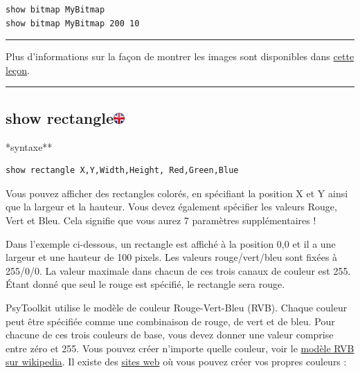 \documentclass[
]{book}
\begin{document}
\begin{verbatim}
show bitmap MyBitmap
show bitmap MyBitmap 200 10
\end{verbatim}

\begin{center}\rule{0.5\linewidth}{0.5pt}\end{center}

Plus d'informations sur la façon de montrer les images sont disponibles dans \href{https://www.psytoolkit.org/lessons/show_bitmaps.html}{cette leçon}.

\begin{center}\rule{0.5\linewidth}{0.5pt}\end{center}

\hypertarget{show-rectangle}{%
\subsection[show rectangle]{\texorpdfstring{show rectangle\href{https://www.psytoolkit.org/doc3.4.0/syntax.html\#task-show-rectangle}{\protect\includegraphics{img/ukflag.png}}}{show rectangle}}\label{show-rectangle}}

*syntaxe**

\begin{verbatim}
show rectangle X,Y,Width,Height, Red,Green,Blue
\end{verbatim}

Vous pouvez afficher des rectangles colorés, en spécifiant la position X et Y ainsi que la largeur et la hauteur. Vous devez également spécifier les valeurs Rouge, Vert et Bleu. Cela signifie que vous aurez 7 paramètres supplémentaires !

Dans l'exemple ci-dessous, un rectangle est affiché à la position 0,0 et il a une largeur et une hauteur de 100 pixels. Les valeurs rouge/vert/bleu sont fixées à 255/0/0. La valeur maximale dans chacun de ces trois canaux de couleur est 255. Étant donné que seul le rouge est spécifié, le rectangle sera rouge.

PsyToolkit utilise le modèle de couleur Rouge-Vert-Bleu (RVB). Chaque couleur peut être spécifiée comme une combinaison de rouge, de vert et de bleu. Pour chacune de ces trois couleurs de base, vous devez donner une valeur comprise entre zéro et 255. Vous pouvez créer n'importe quelle couleur, voir le \href{http://fr.wikipedia.org/wiki/Rgb}{modèle RVB sur wikipedia}. Il existe des \href{https://www.rapidtables.com/web/color/RGB_Color.html}{sites web} où vous pouvez créer vos propres couleurs :
\end{document}
